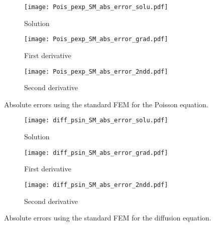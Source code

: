 \documentclass[final,3p]{elsarticle}
\begin{document}
\begin{figure}[!ht]
    \begin{subfigure}{5.5cm}
        \texttt{[image: Pois\_pexp\_SM\_abs\_error\_solu.pdf]}
        \caption{Solution}
        \label{Fig:Pois_pexp_SM_abs_error_solu}
    \end{subfigure}
    \begin{subfigure}{5.5cm}
        \texttt{[image: Pois\_pexp\_SM\_abs\_error\_grad.pdf]}
        \caption{First derivative}
        \label{Fig:Pois_pexp_SM_abs_error_grad}
    \end{subfigure}
    \begin{subfigure}{5.5cm}
        \texttt{[image: Pois\_pexp\_SM\_abs\_error\_2ndd.pdf]}
        \caption{Second derivative}
        \label{Fig:Pois_pexp_SM_abs_error_2ndd}
    \end{subfigure}
\caption{Absolute errors using the standard FEM for the Poisson equation.}
\label{Fig:Pois_pexp_SM_abs_error}
\end{figure}

\begin{figure}[!ht]
    \begin{subfigure}{5.5cm}
        \texttt{[image: diff\_psin\_SM\_abs\_error\_solu.pdf]}
        \caption{Solution}
        \label{Fig:diff_psin_SM_abs_error_solu}
    \end{subfigure}
    \begin{subfigure}{5.5cm}
        \texttt{[image: diff\_psin\_SM\_abs\_error\_grad.pdf]}
        \caption{First derivative}
        \label{Fig:diff_psin_SM_abs_error_grad}
    \end{subfigure}
    \begin{subfigure}{5.5cm}
        \texttt{[image: diff\_psin\_SM\_abs\_error\_2ndd.pdf]}
        \caption{Second derivative}
        \label{Fig:diff_psin_SM_abs_error_2ndd}
    \end{subfigure}
\caption{Absolute errors using the standard FEM for the diffusion equation.}
\label{Fig:diff_psin_SM_abs_error}
\end{figure}
\end{document}
